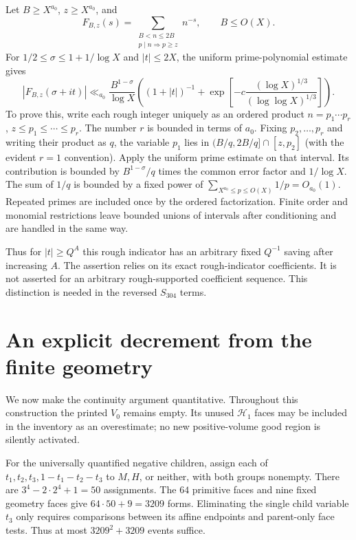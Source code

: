 Let $B\ge X^{a_0}$, $z\ge X^{a_0}$, and
\[
 F_{B,z}(s)=\sum_{\substack{B<n\le2B\\p\mid n\Rightarrow p\ge z}}n^{-s},
 \qquad B\le O(X).
\]
For $1/2\le\sigma\le1+1/\log X$ and $|t|\le2X$, the uniform
prime-polynomial estimate gives
\[
 |F_{B,z}(\sigma+it)|\ll_{a_0}
 \frac{B^{1-\sigma}}{\log X}
 \left((1+|t|)^{-1}+
 \exp\!\left[-c\frac{(\log X)^{1/3}}{(\log\log X)^{1/3}}\right]\right).
\]
To prove this, write each rough integer uniquely as an ordered
product $n=p_1\cdots p_r$, $z\le p_1\le\cdots\le p_r$.
The number $r$ is bounded in terms of $a_0$. Fixing
$p_2,\ldots,p_r$ and writing their product as $q$, the variable
$p_1$ lies in $(B/q,2B/q]\cap[z,p_2]$ (with the evident $r=1$
convention). Apply the uniform prime estimate on that interval.
Its contribution is bounded by $B^{1-\sigma}/q$ times the common
error factor and $1/\log X$. The sum of $1/q$ is bounded by a
fixed power of $\sum_{X^{a_0}\le p\le O(X)}1/p=O_{a_0}(1)$.
Repeated primes are included once by the ordered factorization.
Finite order and monomial restrictions leave bounded unions of
intervals after conditioning and are handled in the same way.

Thus for $|t|\ge Q^A$ this rough indicator has an arbitrary fixed
$Q^{-1}$ saving after increasing $A$.
The assertion relies on its exact rough-indicator coefficients.
It is not asserted for an arbitrary rough-supported coefficient sequence.
This distinction is needed in the reversed $S_{304}$ terms.

\section{An explicit decrement from the finite geometry}\label{app:explicit}

We now make the continuity argument quantitative. Throughout this
construction the printed $V_0$ remains empty. Its unused
$\mathcal H_1$ faces may be included in the inventory as an
overestimate; no new positive-volume good region is silently activated.

For the universally quantified negative children, assign each of
$t_1,t_2,t_3,1-t_1-t_2-t_3$ to $M,H$, or neither, with both groups
nonempty. There are $3^4-2\cdot2^4+1=50$ assignments.
The $64$ primitive faces and nine fixed geometry faces give
$64\cdot50+9=3209$ forms.
Eliminating the single child variable $t_3$ only requires comparisons
between its affine endpoints and parent-only face tests. Thus at most
$3209^2+3209$ events suffice.

